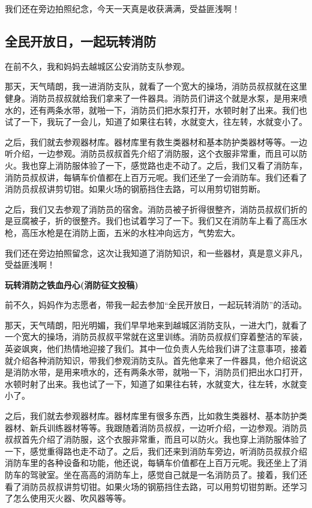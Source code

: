 \documentclass[UTF8,a4paper,titlepage,twoside,10.5pt]{article}
\begin{document}
我们还在旁边拍照纪念，今天一天真是收获满满，受益匪浅啊！

\subsection{全民开放日，一起玩转消防}
\label{sec:org646f56d}

在前不久，我和妈妈去越城区公安消防支队参观。

那天，天气晴朗，我一进消防支队，就看了一个宽大的操场，消防员叔叔就在这里健身。消防员叔叔就给我们拿来了一件器具。消防员们讲这个就是水泵，是用来喷水的，还有两条水带，就啪一下，消防员们把水泵打开，水顿时射了出来。我们也试了一下，我玩了一会儿，知道了如果往右转，水就变大，往左转，水就变小了。

之后，我们就去参观器材库。器材库里有救生类器材和基本防护类器材等等。一边听介绍，一边参观。消防员叔叔首先介绍了消防服，这个衣服非常重，而且可以防火。我也穿上消防服体验了一下，感觉路也走不动了。之后，我们又看了消防车，消防员叔叔讲，每辆车价值都在上百万元呢。我们还坐了一会消防车。我们还看了消防员叔叔讲剪切钳。如果火场的钢筋挡住去路，可以用剪切钳剪断。

之后，我们又去参观了消防员的宿舍。消防员被子折得很整齐，消防员叔叔们折的是豆腐被子，折的很整齐。我们也试着学习了一下。我们又在消防车上看了高压水枪，高压水枪是在消防上面，五米的水柱冲向远方，气势宏大。

我们还在旁边拍照留念，这次让我知道了消防知识，和一些器材，真是意义非凡，受益匪浅啊！

\vspace*{\baselineskip}

\textbf{玩转消防之铁血丹心(消防征文投稿)}

前不久，妈妈作为志愿者，带我一起去参加“全民开放日，一起玩转消防”的活动。

那天，天气晴朗，阳光明媚，我们早早地来到越城区消防支队，一进大门，就看了一个宽大的操场，消防员叔叔平常就在这里训练。消防员叔叔们穿着整洁的军装，英姿飒爽，他们热情地迎接了我们。其中一位负责人先给我们讲了注意事项，接着就介绍各种消防知识，带我们参观消防支队。首先他拿来了一件器具，他介绍说这是消防水带，是用来喷水的，还有两条水带，就啪一下，消防员们把出水口打开，水顿时射了出来。我也试了一下，知道了如果往右转，水就变大，往左转，水就变小了。

之后，我们就去参观器材库。器材库里有很多东西，比如救生类器材、基本防护类器材、新兵训练器材等等。我跟随着消防员叔叔，一边听介绍，一边参观。消防员叔叔首先介绍了消防服，这个衣服非常重，而且可以防火。我也穿上消防服体验了一下，感觉重得路也走不动了。之后，我们还来到消防车旁边，听消防员叔叔介绍消防车里的各种设备和功能，他还说，每辆车价值都在上百万元呢。我还坐上了消防车的驾驶室。坐在高高的消防车上，感觉自己就是一名消防员了。接着，我们还看了消防员叔叔讲剪切钳。如果火场的钢筋挡住去路，可以用剪切钳剪断。还学习了怎么使用灭火器、吹风器等等。
\end{document}
